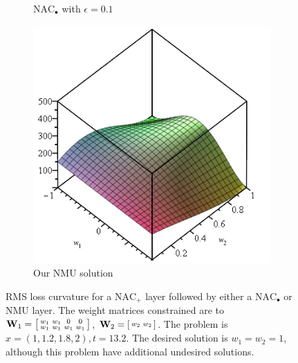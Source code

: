 \begin{figure}[h]
\begin{subfigure}{.33\textwidth}
  \caption{$\mathrm{NAC}_{\bullet}$ with $\epsilon = 0.1$}
\end{subfigure}
\begin{subfigure}{.33\textwidth}
  \centering
\includegraphics[width=\linewidth]{graphics/nac-mul-nmu.png}
  \caption{Our NMU solution}
\end{subfigure}

\caption{RMS loss curvature for a $\mathrm{NAC}_{+}$ layer followed by either a $\mathrm{NAC}_{\bullet}$ or NMU layer. The weight matrices constrained are to $\mathbf{W}_1 = \left[\protect\begin{smallmatrix}
w_1 & w_1 & 0 & 0 \\
w_1 & w_1 & w_1 & w_1
\protect\end{smallmatrix}\right]$, $\mathbf{W}_2 = \left[\protect\begin{smallmatrix}
w_2 & w_2
\protect\end{smallmatrix}\right]$. The problem is $x = \left(1, 1.2, 1.8, 2\right), t = 13.2$. The desired solution is $w_1 = w_2 = 1$, although this problem have additional undesired solutions.}
\label{fig:nac-mul-eps-issue}
\end{figure}

